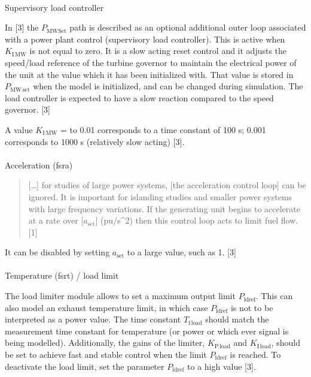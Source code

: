 \documentclass[
  a4paper,
  DIV=11,
  numbers=noendperiod]{scrartcl}
\makeatletter
\let\oldparagraph\paragraph
\renewcommand{\paragraph}{
    \@ifstar
      \xxxParagraphStar
      \xxxParagraphNoStar
  }
\newcommand{\xxxParagraphStar}[1]{\oldparagraph*{#1}\mbox{}}
\newcommand{\xxxParagraphNoStar}[1]{\oldparagraph{#1}\mbox{}}
\makeatother
\begin{document}
\paragraph{Supervisory load
controller}\label{supervisory-load-controller}

In {[}3{]} the \(P_\mathrm{MWSet}\) path is described as an optional
additional outer loop associated with a power plant control (supervisory
load controller). This is active when \(K_\mathrm{I\,MW}\) is not equal
to zero. It is a slow acting reset control and it adjusts the speed/load
reference of the turbine governor to maintain the electrical power of
the unit at the value which it has been initialized with. That value is
stored in \(P_\mathrm{MW\,set}\) when the model is initialized, and can
be changed during simulation. The load controller is expected to have a
slow reaction compared to the speed governor. {[}3{]}

A value \(K_\mathrm{I\,MW}\) = to 0.01 corresponds to a time constant of
100 s; 0.001 corresponds to 1000 s (relatively slow acting) {[}3{]}.

\paragraph{Acceleration (fsra)}\label{acceleration-fsra}

\begin{quote}
{[}\ldots{]} for studies of large power systems, {[}the acceleration
control loop{]} can be ignored. It is important for islanding studies
and smaller power systems with large frequency variations. If the
generating unit begins to accelerate at a rate over
{[}\(a_\mathrm{set}\){]} (pu/s\^{}2) then this control loop acts to
limit fuel flow. {[}1{]}
\end{quote}

It can be disabled by setting \(a_\mathrm{set}\) to a large value, such
as 1. {[}3{]}

\paragraph{Temperature (fsrt) / load
limit}\label{temperature-fsrt-load-limit}

The load limiter module allows to set a maximum output limit
\(P_\mathrm{ldref}\). This can also model an exhaust temperature limit,
in which case \(P_\mathrm{ldref}\) is not to be interpreted as a power
value. The time constant \(T_\mathrm{f\,load}\) should match the
measurement time constant for temperature (or power or which ever signal
is being modelled). Additionally, the gains of the limiter,
\(K_\mathrm{P\,load}\) and \(K_\mathrm{I\,load}\), should be set to
achieve fast and stable control when the limit \(P_\mathrm{ldref}\) is
reached. To deactivate the load limit, set the parameter
\(P_\mathrm{ldref}\) to a high value {[}3{]}.
\end{document}
